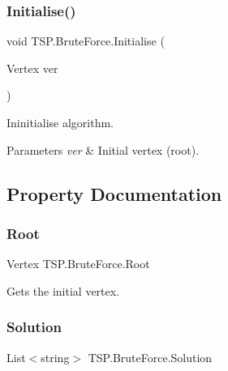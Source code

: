 \subsubsection{\texorpdfstring{Initialise()}{Initialise()}}
{\footnotesize\ttfamily void T\+S\+P.\+Brute\+Force.\+Initialise (\begin{DoxyParamCaption}\item[{Vertex}]{ver }\end{DoxyParamCaption})\hspace{0.3cm}{\ttfamily [inline]}}



Ininitialise algorithm. 


\begin{DoxyParams}{Parameters}
{\em ver} & Initial vertex (root).\\
\hline
\end{DoxyParams}


\subsection{Property Documentation}
\mbox{\label{class_t_s_p_1_1_brute_force_acff5ab4beabff92192f8c782fecb3240}} 
\subsubsection{\texorpdfstring{Root}{Root}}
{\footnotesize\ttfamily Vertex T\+S\+P.\+Brute\+Force.\+Root\hspace{0.3cm}{\ttfamily [get]}}



Gets the initial vertex. 

\mbox{\label{class_t_s_p_1_1_brute_force_a1110ef3515d0412f462c18d4bece07e6}} 
\subsubsection{\texorpdfstring{Solution}{Solution}}
{\footnotesize\ttfamily List$<$string$>$ T\+S\+P.\+Brute\+Force.\+Solution\hspace{0.3cm}{\ttfamily [get]}}



